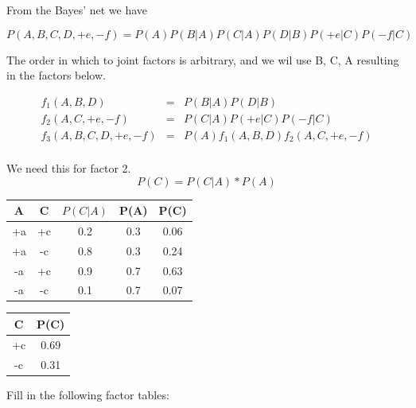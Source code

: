 \documentclass[12pt]{article}
\begin{document}
From the Bayes' net we have

$$P(A,B,C,D,+e,-f) = P(A) P(B|A) P(C|A) P(D|B) P(+e|C) P(-f|C)$$

The order in which to joint factors is arbitrary, and we wil use B, C, A resulting in the factors below.

\begin{eqnarray*}
f_1(A,B,D)         &=& P(B|A) P(D|B) \\[.1in]
f_2(A,C,+e,-f)     &=& P(C|A) P(+e|C) P(-f|C) \\[.1in]
f_3(A,B,C,D,+e,-f) &=& P(A) f_1(A,B,D) f_2(A,C,+e,-f) \\[.1in]
\end{eqnarray*}

We need this for factor 2.
$$P(C) = P(C | A) * P(A)$$
\begin{center}
\begin{tabular}{|c|c|c|c|c|} \hline
A & C & $P(C|A)$  &  P(A) & P(C) \\ \hline
+a & +c  & 0.2 & 0.3 & 0.06  \\ \hline
+a & -c  & 0.8 & 0.3 & 0.24 \\ \hline
-a & +c  & 0.9 & 0.7 & 0.63 \\ \hline
-a & -c  & 0.1 & 0.7 & 0.07 \\ \hline
\end{tabular}
\hspace{1in}
\begin{tabular}{|c|c|} \hline
C & P(C) \\ \hline
+c & 0.69 \\ \hline
-c & 0.31 \\ \hline
\end{tabular}
\end{center}

Fill in the following factor tables:
\end{document}
